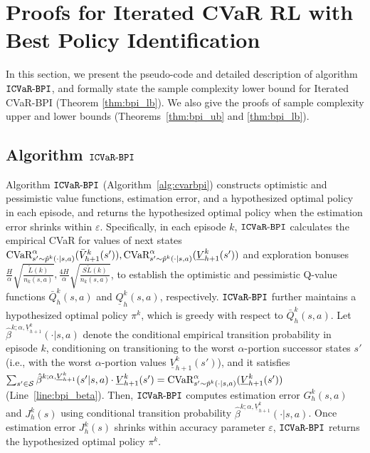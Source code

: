 \section{Proofs for Iterated CVaR RL with Best Policy Identification}\label{apx:bpi}

In this section, we present the pseudo-code and detailed description of algorithm $\mathtt{ICVaR\mbox{-}BPI}$, and formally state the sample complexity lower bound for Iterated CVaR-BPI (Theorem \ref{thm:bpi_lb}). We also give the proofs of sample complexity upper and lower bounds (Theorems~\ref{thm:bpi_ub} and \ref{thm:bpi_lb}).


\subsection{Algorithm $\mathtt{ICVaR\mbox{-}BPI}$} \label{apx:bpi_alg}

Algorithm $\mathtt{ICVaR\mbox{-}BPI}$ (Algorithm~\ref{alg:cvarbpi}) constructs optimistic and pessimistic value functions, estimation error, and a hypothesized optimal policy in each episode, and returns the hypothesized optimal policy when the estimation error shrinks within $\varepsilon$. 
Specifically, in each episode $k$, $\mathtt{ICVaR\mbox{-}BPI}$ calculates the empirical CVaR for values of next states 
$\textup{CVaR}^{\alpha}_{s' \sim \hat{p}^k(\cdot|s,a)}(\bar{V}^k_{h+1}(s')), \textup{CVaR}^{\alpha}_{s' \sim \hat{p}^k(\cdot|s,a)}(\underline{V}^k_{h+1}(s'))$ and exploration bonuses  $\frac{H}{\alpha}\sqrt{\frac{\tilde{L}(k)}{n_k(s,a)}}, \frac{4H}{\alpha}\sqrt{\frac{S\tilde{L}(k)}{n_k(s,a)}}$, to establish the optimistic and pessimistic Q-value functions $\bar{Q}^k_h(s,a)$ and $\underline{Q}^k_h(s,a)$, respectively. 
$\mathtt{ICVaR\mbox{-}BPI}$ further maintains a hypothesized optimal policy $\pi^k$, which is greedy with respect to $\bar{Q}^k_h(s,a)$.
Let $\hat{\beta}^{k;\alpha,\underline{V}^k_{h+1}}(\cdot|s,a)$ denote the conditional empirical transition probability in episode $k$, conditioning on transitioning to the worst $\alpha$-portion successor states $s'$ (i.e., with the worst $\alpha$-portion values $\underline{V}^k_{h+1}(s')$), and it satisfies $\sum_{s' \in \mathcal{S}} \hat{\beta}^{k;\alpha,\underline{V}^k_{h+1}}(s'|s,a) \cdot \underline{V}^k_{h+1}(s') = \textup{CVaR}^{\alpha}_{s' \sim \hat{p}^k(\cdot|s,a)}(\underline{V}^k_{h+1}(s'))$ (Line~\ref{line:bpi_beta}).
Then, $\mathtt{ICVaR\mbox{-}BPI}$ computes estimation error $G^k_h(s,a)$ and $J^k_h(s)$ using conditional transition probability $\hat{\beta}^{k;\alpha,\underline{V}^k_{h+1}}(\cdot|s,a)$. 
Once estimation error $J^k_h(s)$ shrinks within accuracy parameter $\varepsilon$, $\mathtt{ICVaR\mbox{-}BPI}$ returns the hypothesized optimal policy $\pi^k$.

